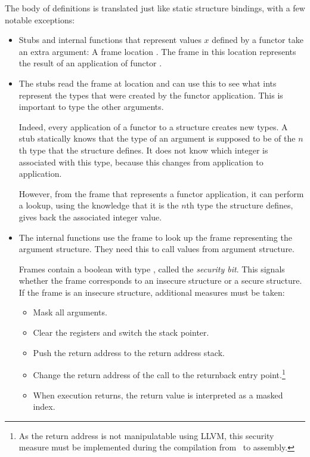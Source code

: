 The body of definitions is translated just like static structure bindings, with a few notable exceptions:
\begin{itemize}
\item Stubs and internal functions that represent values $x$ defined by a functor  take an extra argument: A frame location .
The frame  in this location represents the result of an application of functor .
\item The stubs read the frame  at location  and can use this to see what ints represent the types that were created by the functor application.
This is important to type the other arguments.

Indeed, every application of a functor to a structure creates new types. 
A stub statically knows that the type of an argument is supposed to be of the $n$th type that the structure defines. It does not know which integer is associated with this type, because this changes from application to application.

However, from the frame that represents a functor application, it can perform a lookup, using the knowledge that it is the $n$th type the structure defines, gives back the associated integer value.
\item The internal functions use the frame to look up the frame representing the argument structure.
They need this to call values from argument structure.

Frames contain a boolean with type , called the \emph{security bit}. 
This signals whether the frame corresponds to an insecure structure or a secure structure.
If the frame is an insecure structure, additional measures must be taken:
\begin{itemize}
\item Mask all arguments.
\item Clear the registers and switch the stack pointer.
\item Push the return address to the return address stack.
\item Change the return address of the call to the returnback entry point.\footnote{As the return address is not manipulatable using LLVM, this security measure must be implemented during the compilation from \LLVMIR\ to assembly.}
\item When execution returns, the return value is interpreted as a masked index.
\end{itemize}
\end{itemize}

